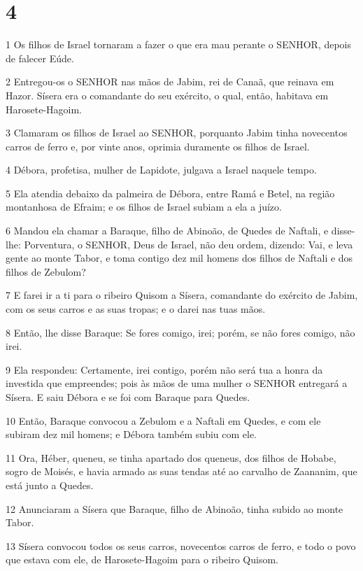 \chapter{4}

\par 1 Os filhos de Israel tornaram a fazer o que era mau perante o SENHOR, depois de falecer Eúde.
\par 2 Entregou-os o SENHOR nas mãos de Jabim, rei de Canaã, que reinava em Hazor. Sísera era o comandante do seu exército, o qual, então, habitava em Harosete-Hagoim.
\par 3 Clamaram os filhos de Israel ao SENHOR, porquanto Jabim tinha novecentos carros de ferro e, por vinte anos, oprimia duramente os filhos de Israel.
\par 4 Débora, profetisa, mulher de Lapidote, julgava a Israel naquele tempo.
\par 5 Ela atendia debaixo da palmeira de Débora, entre Ramá e Betel, na região montanhosa de Efraim; e os filhos de Israel subiam a ela a juízo.
\par 6 Mandou ela chamar a Baraque, filho de Abinoão, de Quedes de Naftali, e disse-lhe: Porventura, o SENHOR, Deus de Israel, não deu ordem, dizendo: Vai, e leva gente ao monte Tabor, e toma contigo dez mil homens dos filhos de Naftali e dos filhos de Zebulom?
\par 7 E farei ir a ti para o ribeiro Quisom a Sísera, comandante do exército de Jabim, com os seus carros e as suas tropas; e o darei nas tuas mãos.
\par 8 Então, lhe disse Baraque: Se fores comigo, irei; porém, se não fores comigo, não irei.
\par 9 Ela respondeu: Certamente, irei contigo, porém não será tua a honra da investida que empreendes; pois às mãos de uma mulher o SENHOR entregará a Sísera. E saiu Débora e se foi com Baraque para Quedes.
\par 10 Então, Baraque convocou a Zebulom e a Naftali em Quedes, e com ele subiram dez mil homens; e Débora também subiu com ele.
\par 11 Ora, Héber, queneu, se tinha apartado dos queneus, dos filhos de Hobabe, sogro de Moisés, e havia armado as suas tendas até ao carvalho de Zaananim, que está junto a Quedes.
\par 12 Anunciaram a Sísera que Baraque, filho de Abinoão, tinha subido ao monte Tabor.
\par 13 Sísera convocou todos os seus carros, novecentos carros de ferro, e todo o povo que estava com ele, de Harosete-Hagoim para o ribeiro Quisom.
